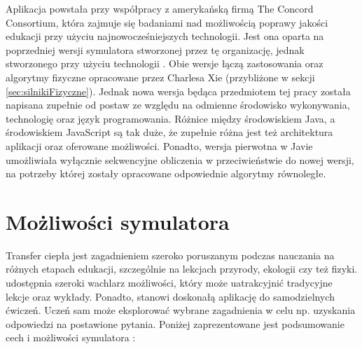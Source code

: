 Aplikacja powstała przy współpracy z amerykańską firmą The Concord Consortium,
która zajmuje się badaniami nad możliwością poprawy jakości edukacji przy użyciu
najnowocześniejszych technologii. Jest ona oparta na poprzedniej wersji
symulatora stworzonej przez tę organizację, jednak stworzonego przy użyciu
technologii . Obie wersje łączą zastosowania oraz algorytmy fizyczne
opracowane przez Charlesa Xie (przybliżone w sekcji \ref{sec:silnikiFizyczne}).
Jednak nowa wersja będąca przedmiotem tej pracy została napisana zupełnie od
postaw ze względu na odmienne środowisko wykonywania, technologię oraz język
programowania. Różnice między środowiskiem Java, a środowiskiem JavaScript są
tak duże, że zupełnie różna jest też architektura aplikacji oraz oferowane
możliwości. Ponadto, wersja pierwotna w Javie umożliwiała wyłącznie sekwencyjne
obliczenia w przeciwieństwie do nowej wersji, na potrzeby której zostały
opracowane odpowiednie algorytmy równoległe.


\section{Możliwości symulatora}

Transfer ciepła jest zagadnieniem szeroko poruszanym podczas nauczania na
różnych etapach edukacji, szczególnie na lekcjach przyrody, ekologii czy też
fizyki. \en udostępnia szeroki wachlarz możliwości, który może uatrakcyjnić
tradycyjne lekcje oraz wykłady. Ponadto, stanowi doskonałą aplikację do
samodzielnych ćwiczeń. Uczeń sam może eksplorować wybrane zagadnienia w celu np.
uzyskania odpowiedzi na postawione pytania. Poniżej zaprezentowane jest
podsumowanie cech i możliwości symulatora \en:

